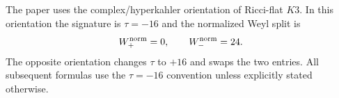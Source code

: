 
\makeatletter
{}
\makeatother
\providecommand{\PSp}{\mathrm{PSp}}
\providecommand{\Aut}{\mathrm{Aut}}
\providecommand{\spec}{\operatorname{spec}}


\begin{remark}
\label{rem:k3-global-orientation}
The paper uses the complex/hyperkahler orientation of Ricci-flat $K3$.  In this
orientation the signature is $\tau=-16$ and the normalized Weyl split is
\[
  W_+^{\rm norm}=0,\qquad W_-^{\rm norm}=24.
\]
The opposite orientation changes $\tau$ to $+16$ and swaps the two entries.  All
subsequent formulas use the $\tau=-16$ convention unless explicitly stated
otherwise.
\end{remark}
